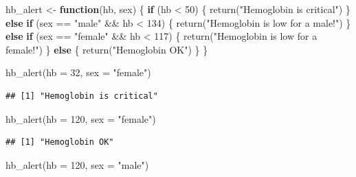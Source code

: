 \documentclass[
]{book}
\newenvironment{Shaded}{\begin{snugshade}}{\end{snugshade}}
\newcommand{\AttributeTok}[1]{\textcolor[rgb]{0.77,0.63,0.00}{#1}}
\newcommand{\ControlFlowTok}[1]{\textcolor[rgb]{0.13,0.29,0.53}{\textbf{#1}}}
\newcommand{\DecValTok}[1]{\textcolor[rgb]{0.00,0.00,0.81}{#1}}
\newcommand{\FunctionTok}[1]{\textcolor[rgb]{0.00,0.00,0.00}{#1}}
\newcommand{\NormalTok}[1]{#1}
\newcommand{\OtherTok}[1]{\textcolor[rgb]{0.56,0.35,0.01}{#1}}
\newcommand{\SpecialCharTok}[1]{\textcolor[rgb]{0.00,0.00,0.00}{#1}}
\newcommand{\StringTok}[1]{\textcolor[rgb]{0.31,0.60,0.02}{#1}}
\begin{document}
\begin{Shaded}
\begin{Highlighting}[]
\NormalTok{hb\_alert }\OtherTok{\textless{}{-}} \ControlFlowTok{function}\NormalTok{(hb, sex) \{}
  \ControlFlowTok{if}\NormalTok{ (hb }\SpecialCharTok{\textless{}} \DecValTok{50}\NormalTok{) \{}
    \FunctionTok{return}\NormalTok{(}\StringTok{"Hemoglobin is critical"}\NormalTok{)}
\NormalTok{  \} }\ControlFlowTok{else} \ControlFlowTok{if}\NormalTok{ (sex }\SpecialCharTok{==} \StringTok{"male"} \SpecialCharTok{\&\&}\NormalTok{ hb }\SpecialCharTok{\textless{}} \DecValTok{134}\NormalTok{) \{}
    \FunctionTok{return}\NormalTok{(}\StringTok{"Hemoglobin is low for a male!"}\NormalTok{)}
\NormalTok{  \} }\ControlFlowTok{else} \ControlFlowTok{if}\NormalTok{ (sex }\SpecialCharTok{==} \StringTok{"female"} \SpecialCharTok{\&\&}\NormalTok{ hb }\SpecialCharTok{\textless{}} \DecValTok{117}\NormalTok{) \{}
    \FunctionTok{return}\NormalTok{(}\StringTok{"Hemoglobin is low for a female!"}\NormalTok{)}
\NormalTok{  \} }\ControlFlowTok{else}\NormalTok{ \{}
    \FunctionTok{return}\NormalTok{(}\StringTok{"Hemoglobin OK"}\NormalTok{)}
\NormalTok{  \}}
\NormalTok{\}}

\FunctionTok{hb\_alert}\NormalTok{(}\AttributeTok{hb =} \DecValTok{32}\NormalTok{, }\AttributeTok{sex =} \StringTok{"female"}\NormalTok{)}
\end{Highlighting}
\end{Shaded}

\begin{verbatim}
## [1] "Hemoglobin is critical"
\end{verbatim}

\begin{Shaded}
\begin{Highlighting}[]
\FunctionTok{hb\_alert}\NormalTok{(}\AttributeTok{hb =} \DecValTok{120}\NormalTok{, }\AttributeTok{sex =} \StringTok{"female"}\NormalTok{)}
\end{Highlighting}
\end{Shaded}

\begin{verbatim}
## [1] "Hemoglobin OK"
\end{verbatim}

\begin{Shaded}
\begin{Highlighting}[]
\FunctionTok{hb\_alert}\NormalTok{(}\AttributeTok{hb =} \DecValTok{120}\NormalTok{, }\AttributeTok{sex =} \StringTok{"male"}\NormalTok{)}
\end{Highlighting}
\end{Shaded}
\end{document}
